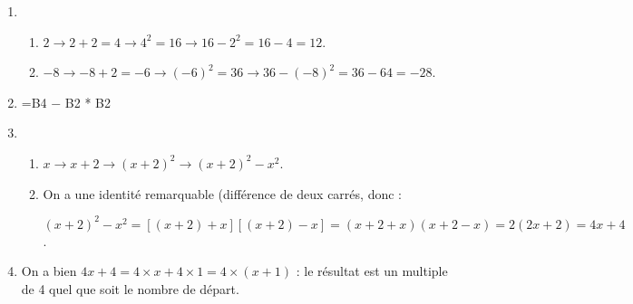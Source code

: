\begin{enumerate}
\item %
	\begin{enumerate}
		\item %
$2 \to 2 + 2 = 4 \to 4^2 = 16 \to 16 - 2^2 = 16 - 4 = 12$.
		\item %
$- 8 \to -8 + 2 = - 6 \to (- 6)^2 = 36 \to 36 - (- 8)^2 = 36 - 64 = - 28$.
	\end{enumerate}
\item %

=B4 $-$ B2 * B2
\item 
	\begin{enumerate}
		\item %
$x \to x + 2 \to (x + 2)^2 \to (x + 2)^2 - x^2$.
		\item %
On a une identité remarquable (différence de deux carrés, donc :
		
$(x + 2)^2 - x^2 = [(x + 2) + x][(x + 2) - x] = (x + 2 + x)(x + 2 - x) = 2(2x + 2) = 4x + 4$.
	\end{enumerate}
\item %
On a bien $4x + 4 = 4\times x + 4 \times 1 = 4\times (x + 1)$ : le résultat est un multiple de 4 quel que soit le nombre de départ.
\end{enumerate}

\medskip

